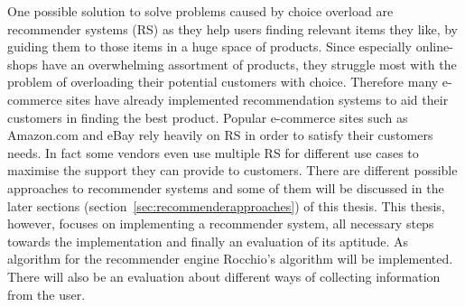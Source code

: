 One possible solution to solve problems caused by choice overload are recommender systems (RS) as they help users finding relevant items they like, by guiding them to those items in a huge space of products.\citep[p.~63]{bollen:2010}
Since especially online-shops have an overwhelming assortment of products, they struggle most with the problem of overloading their potential customers with choice.
Therefore many \gls{e-commerce} sites have already implemented recommendation systems to aid their customers in finding the best product.
Popular e-commerce sites such as Amazon.com and \gls{eBay} rely heavily on RS in order to satisfy their customers needs.
In fact some vendors even use multiple RS for different use cases to maximise the support they can provide to customers.
\citep[p.~158]{schafer:1999}
There are different possible approaches to recommender systems and some of them will be discussed in the later sections (section~\ref{sec:recommenderapproaches}) of this thesis.
This thesis, however, focuses on implementing a recommender system, all necessary steps towards the implementation and finally an evaluation of its aptitude.
As algorithm for the recommender engine Rocchio's algorithm will be implemented.
There will also be an evaluation about different ways of collecting information from the user.


